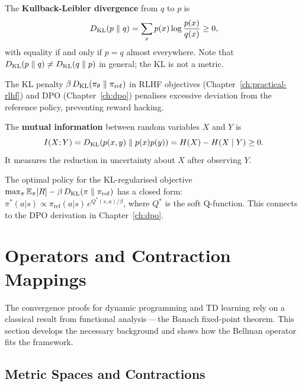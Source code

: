 \begin{definition}[KL Divergence]
\label{def:kl}
The \textbf{Kullback-Leibler divergence} from $q$ to
$p$ is
\[
    D_{\mathrm{KL}}\!\left(p\;\|\;q\right) = \sum_x p(x)\log\frac{p(x)}{q(x)} \geq 0,
\]
with equality if and only if $p = q$ almost everywhere.  Note that
$D_{\mathrm{KL}}\!\left(p\;\|\;q\right) \neq D_{\mathrm{KL}}\!\left(q\;\|\;p\right)$ in general; the KL is not a metric.
\end{definition}

The KL penalty $\beta\,D_{\mathrm{KL}}\!\left(\pi_\theta\;\|\;\pi_\mathrm{ref}\right)$ in RLHF
objectives (Chapter~\ref{ch:practical-rlhf}) and DPO
(Chapter~\ref{ch:dpo}) penalises excessive deviation from the
reference policy, preventing reward hacking.

\begin{definition}
\label{def:mutual-info}
The \textbf{mutual information} between random variables $X$ and $Y$ is
\[
    I(X;Y) = D_{\mathrm{KL}}\!\left(p(x,y)\;\|\;p(x)p(y)\right)
            = H(X) - H(X \mid Y) \geq 0.
\]
It measures the reduction in uncertainty about $X$ after observing $Y$.
\end{definition}

\begin{example}[KL regularised RL]
The optimal policy for the KL-regularised objective
$\max_\pi \operatorname{\mathbb{E}}_\pi[R] - \beta\,D_{\mathrm{KL}}\!\left(\pi\;\|\;\pi_\mathrm{ref}\right)$
has a closed form: $\pi^*(a|s) \propto \pi_\mathrm{ref}(a|s)\,
e^{Q^*(s,a)/\beta}$, where $Q^*$ is the soft Q-function.  This
connects to the DPO derivation in Chapter~\ref{ch:dpo}.
\end{example}

\section{Operators and Contraction Mappings}
\label{app:operators}

The convergence proofs for dynamic programming and TD learning rely on a
classical result from functional analysis\,---\,the Banach fixed-point
theorem.  This section develops the necessary background and shows how the
Bellman operator fits the framework.

\subsection*{Metric Spaces and Contractions}

